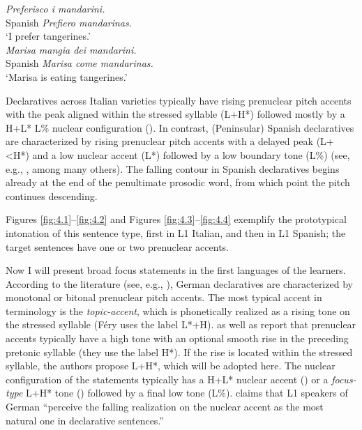 \ea\label{ex:4:1}      \textit{Preferisco i mandarini.} \\
Spanish   \textit{Prefiero mandarinas.} \\
{}      {‘I prefer tangerines.’}\\


\ex\label{ex:4:2}      \textit{Marisa mangia dei mandarini.} \\
Spanish   \textit{Marisa come mandarinas.} \\
{}      {‘Marisa is eating tangerines.’}\\
\z

Declaratives across Italian varieties typically have rising prenuclear pitch accents with the peak aligned within the stressed syllable (L+H*) followed mostly by a H+L* L\% nuclear configuration (\citealt{GiliFivelaEtAl2015}). In contrast, (Peninsular) Spanish declaratives are characterized by rising prenuclear pitch accents with a delayed peak (L+<H*) and a low nuclear accent (L*) followed by a low boundary tone (L\%) (see, e.g., \citealt{Face2003, PrietoRoseano2010, HualdePrieto2015}, among many others). The falling contour in Spanish declaratives begins already at the end of the penultimate prosodic word, from which point the pitch continues descending.


Figures \ref{fig:4.1}--\ref{fig:4.2} and Figures \ref{fig:4.3}--\ref{fig:4.4} exemplify the prototypical intonation of this sentence type, first in L1 Italian, and then in L1 Spanish; the target sentences have one or two prenuclear accents.


Now I will present broad focus statements in the first languages of the learners. According to the literature (see, e.g., \citealt{Uhmann1991, Féry1993, GriceBaumann2002, GriceEtAl2005a, PetroneNiebuhr2014}), German declaratives are characterized by monotonal or bitonal prenuclear pitch accents. The most typical accent in  terminology is the \textit{topic-accent}, which is phonetically realized as a rising tone on the stressed syllable (Féry uses the label L*+H). \citet{GriceBaumann2002} as well as \citet{PetroneNiebuhr2014} report that prenuclear accents typically have a high tone with an optional smooth rise in the preceding pretonic syllable (they use the label H*). If the rise is located within the stressed syllable, the authors propose L+H*, which will be adopted here. The nuclear configuration of the statements typically has a H+L* nuclear accent () or a \textit{focus-type} L+H* tone () followed by a final low tone (L\%). \citet[82]{Féry1993} claims that L1 speakers of German “perceive the falling realization on the nuclear accent as the most natural one in declarative sentences.”\largerpage

